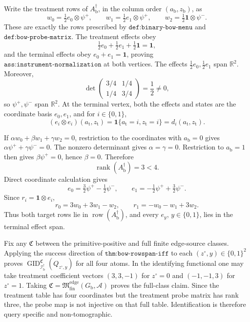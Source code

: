Write the treatment rows of \(A_{\mathrm b}^{\dagger}\), in the column order \((a_{\mathrm b},z_{\mathrm b})\), as
\[
w_0=\tfrac12e_0\otimes\psi^+,
\qquad
w_1=\tfrac12e_1\otimes\psi^+,
\qquad
w_2=\tfrac12\mathbf 1\otimes\psi^-.
\]
These are exactly the rows prescribed by \(\texttt{def:binary-bow-menu}\) and \(\texttt{def:bow-probe-matrix}\).  The treatment effects obey
\[
\tfrac12e_0+\tfrac12e_1+\tfrac12\mathbf 1=\mathbf 1,
\]
and the terminal effects obey \(e_0+e_1=\mathbf 1\), proving \(\texttt{ass:instrument-normalization}\) at both vertices.  The effects \(\tfrac12e_0,\tfrac12e_1\) span \(\mathbb R^2\).  Moreover,
\[
\det\begin{pmatrix}3/4&1/4\\1/4&3/4\end{pmatrix}=\frac12\neq0,
\]
so \(\psi^+,\psi^-\) span \(\mathbb R^2\).  At the terminal vertex, both the effects and states are the coordinate basis \(e_0,e_1\), and for \(i\in\{0,1\}\),
\[
(e_i\otimes e_i)(a_{\mathrm t},z_{\mathrm t})
=\mathbf 1\{a_{\mathrm t}=i,z_{\mathrm t}=i\}
=d_i(a_{\mathrm t},z_{\mathrm t}).
\]

If \(\alpha w_0+\beta w_1+\gamma w_2=0\), restriction to the coordinates with \(a_{\mathrm b}=0\) gives \(\alpha\psi^++\gamma\psi^-=0\).  The nonzero determinant gives \(\alpha=\gamma=0\).  Restriction to \(a_{\mathrm b}=1\) then gives \(\beta\psi^+=0\), hence \(\beta=0\).  Therefore
\[
\operatorname{rank}(A_{\mathrm b}^{\dagger})=3<4.
\]
Direct coordinate calculation gives
\[
e_0=\tfrac32\psi^+-\tfrac12\psi^-,
\qquad
e_1=-\tfrac12\psi^++\tfrac32\psi^-.
\]
Since \(r_i=\mathbf 1\otimes e_i\),
\[
r_0=3w_0+3w_1-w_2,
\qquad
r_1=-w_0-w_1+3w_2.
\]
Thus both target rows lie in \(\operatorname{row}(A_{\mathrm b}^{\dagger})\), and every \(e_y\), \(y\in\{0,1\}\), lies in the terminal effect span.

Fix any \(\mathfrak C\) between the primitive-positive and full finite edge-source classes.  Applying the success direction of \(\texttt{thm:bow-rowspan-iff}\) to each \((z^{\circ},y)\in\{0,1\}^2\) proves \(\operatorname{GID}_{\mathcal I_{\mathrm b}^{\dagger}}^{\mathfrak C}(Q_{z^{\circ},y})\) for all four atoms.  In the identifying functional one may take treatment coefficient vectors \((3,3,-1)\) for \(z^{\circ}=0\) and \((-1,-1,3)\) for \(z^{\circ}=1\).  Taking \(\mathfrak C=\mathfrak M_{\mathrm{fin}}^{\mathrm{edge}}(G_{\mathrm b},\mathcal A)\) proves the full-class claim.  Since the treatment table has four coordinates but the treatment probe matrix has rank three, the probe map is not injective on that full table.  Identification is therefore query specific and non-tomographic.